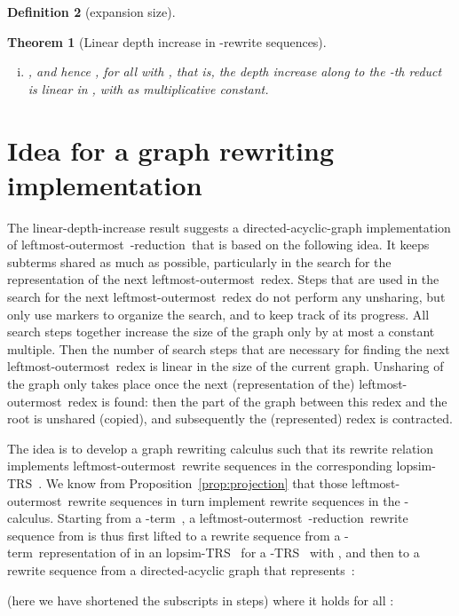 \documentclass[
submission
]{dmtcs-episciences-tampered}
\newcommand{\nb}{\nobreakdash}
\newcommand{\TRS}{TRS}
\newcommand{\lopsimTRS}{lopsim-TRS}
\newcommand{\lambdacalculus}{\nb-cal\-cu\-lus}
\newcommand{\lambdaterm}{\nb-term}
\newcommand{\betareduction}{\nb-re\-duc\-tion}
\newcommand{\lo}{left\-most-outer\-most}
\newcommand{\lTRS}{\hspace*{-0.5pt}\nb-\hspace*{-0.5pt}\TRS}
\theoremstyle{plain}
\newtheorem{theorem}{Theorem}
\theoremstyle{definition}
\newtheorem{definition}[theorem]{Definition}
\begin{document}
\begin{definition}[expansion size]
{\begin{theorem}[Linear depth increase in -rewrite sequences]
\begin{enumerate}[(i)]
      for all  with ,
      that is,
      the depth increase in each step of  is uniformly bounded by . 
    \item  
      ,
      and hence ,
      for all  with ,
      that is,
      the depth increase along  to the \nb-th reduct is linear in ,
      with  as multiplicative constant.
  \end{enumerate}
\end{theorem}





\section{Idea for a graph rewriting implementation}
  \label{sec:idea:graph:implementation}


The linear-depth-increase result suggests a directed-acyclic-graph implementation of \lo\ \betareduction\
that is based on the following idea.
It keeps subterms shared as much as possible, particularly in the search for the
representation of the next \lo\ redex.
Steps that are used in the search for the next \lo\ redex
do not perform any unsharing, but only use markers to organize the search, and to keep track of its progress.
All search steps together increase the size of the graph only by at most a constant multiple.
Then the number of search steps that are necessary for finding the next \lo\ redex is linear in the size of the current graph. 
Unsharing of the graph only takes place once the next (representation of the) \lo\ redex is found:
then the part of the graph between this redex and the root is unshared (copied),
and subsequently the (represented) redex is contracted. 

The idea is to develop a graph rewriting calculus  
such that its rewrite relation  implements
\lo\  rewrite sequences in the corresponding \lopsimTRS~.
We know from Proposition~\ref{prop:projection}
that those \lo\  rewrite sequences in turn implement
 rewrite sequences in the \lambdacalculus.
Starting from a \lambdaterm~,
a \lo\ \betareduction\ rewrite sequence from 
is thus first lifted to a  rewrite sequence 
from a \lambdaterm\ representation  of 
in an \lopsimTRS~ 
for a \lTRS~ with ,
and then to a  rewrite sequence from a directed-acyclic graph  that represents~:\vspace*{-1.5ex}
\begin{center}
  
\end{center}
(here we have shortened the subscripts in  steps)
where it holds for all :
\begin{center}
  

\end{center}}
\end{definition}
\end{document}

